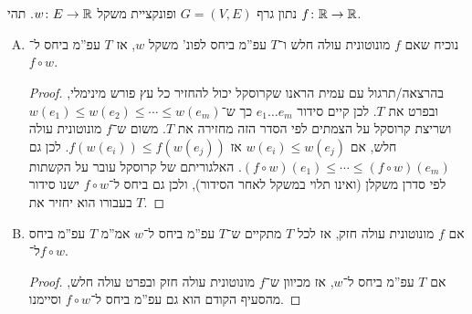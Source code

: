 \documentclass[]{../../../../tex/classes/homework}
\begin{document}
	
\npage%
	
\section{}%
	
	נתון גרף $G = (V, E)$ ופונקציית משקל $w \colon E \to \mathbb{R}$. תהי $f \colon \mathbb{R} \to \mathbb{R}$. 
	\begin{enumerate}[(A)]
		\item נוכיח שאם $f$ מונוטונית עולה חלש ו־$T$ עפ''מ ביחס לפונ' משקל $w$, אז $T$ עפ''מ ביחס ל־$f \circ w$. \begin{proof}
			בהרצאה/תרגול עם עמית הראנו שקרוסקל יכול להחזיר כל עץ פורש מינימלי, ובפרט את $T$. לכן קיים סידור $e_1 \dots e_m$ כך ש־$w(e_1) \le w(e_2) \le \cdots \le w(e_m)$ ושריצת קרוסקל על הצמתים לפי הסדר הזה מחזירה את $T$. משום ש־$f$ מונוטונית עולה חלש, אם $w(e_i) \le w(e_j)$ אז $f(w(e_i)) \le f(w(e_j))$. לכן גם $(f \circ w)(e_1) \le \cdots \le (f \circ w)(e_m)$. האלגוריתם של קרוסקל עובר על הקשתות לפי סדרן משקלן (ואינו תלוי במשקל לאחר הסידור), ולכן גם ביחס ל־$f \circ w$ ישנו סידור בעבורו הוא יחזיר את $T$. 
		\end{proof}
		\item אם $f$ מונוטונית עולה חזק, אז לכל $T$ מתקיים ש־$T$ עפ''מ ביחס ל־$w$ אמ''מ $T$ עפ''מ ביחס ל־$f \circ w$. 
		\begin{proof}
			אם $T$ עפ''מ ביחס ל־$w$, אז מכיוון ש־$f$ מונוטונית עולה חזק ובפרט עולה חלש, מהסעיף הקודם הוא גם עפ''מ ביחס ל־$f \circ w$ וסיימנו. 
			

\end{proof}
\end{enumerate}
\end{document}
